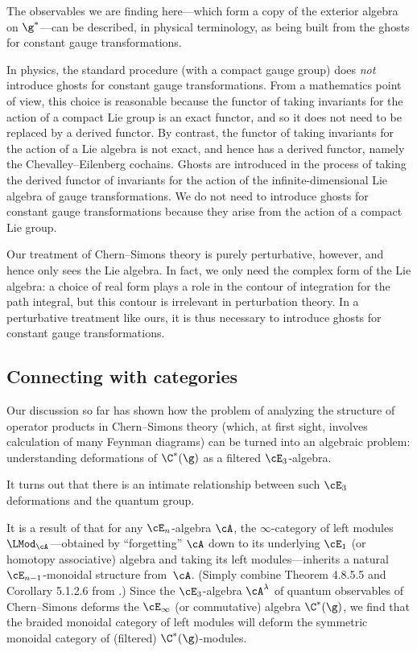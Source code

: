 \documentclass[10pt]{amsart}
\begin{document}
The observables we are finding here---which form a copy of the exterior algebra on $\g^\ast$---can be described, in physical terminology, as being built from the ghosts for constant gauge transformations.  

In physics, the standard procedure (with a compact gauge group) does {\em not} introduce ghosts for constant gauge transformations.  
From a mathematics point of view, this choice is reasonable because the functor of taking invariants for the action of a compact Lie group is an exact functor, 
and so it does not need to be replaced by a derived functor. 
By contrast, the functor of taking invariants for the action of a Lie algebra is not exact, 
and hence has a derived functor, namely the Chevalley--Eilenberg cochains.  
Ghosts are introduced in the process of taking the derived functor of invariants for the action of the infinite-dimensional Lie algebra of gauge transformations.  
We do not need to introduce ghosts for constant gauge transformations because they arise from the action of a compact Lie group.

Our treatment of Chern--Simons theory is purely perturbative, however, and hence only sees the Lie algebra. 
In fact, we only need the complex form of the Lie algebra: 
a choice of real form plays a role in the contour of integration for the path integral, 
but this contour is irrelevant in perturbation theory.  
In a perturbative treatment like ours, it is thus necessary to introduce ghosts for constant gauge transformations.  

\subsection{Connecting with categories}
\label{sec: connect with cats}

Our discussion so far has shown how the problem of analyzing the structure of operator products in Chern--Simons theory (which, at first sight, involves calculation of many Feynman diagrams) can be turned into an algebraic problem: 
understanding deformations of $\C^*(\g)$ as a filtered $\cE_3$-algebra. 

It turns out that there is an intimate relationship between such $\cE_3$ deformations and the quantum group.  

It is a result of \cite{LurHA} that for any $\cE_n$-algebra $\cA$, 
the $\infty$-category of left modules $\LMod_\cA$---obtained 
by ``forgetting'' $\cA$ down to its underlying $\cE_1$ (or homotopy associative) algebra and taking its left 
modules---inherits a natural $\cE_{n-1}$-monoidal structure from~$\cA$.
(Simply combine Theorem 4.8.5.5 and Corollary 5.1.2.6 from \cite{LurHA}.)
Since the $\cE_3$-algebra $\cA^\lambda$ of quantum observables of Chern--Simons deforms the $\cE_\infty$ (or commutative) algebra $\C^*(\g)$, 
we find that the braided monoidal category of left modules will deform the symmetric monoidal category of (filtered) $\C^*(\g)$-modules.  
\end{document}
